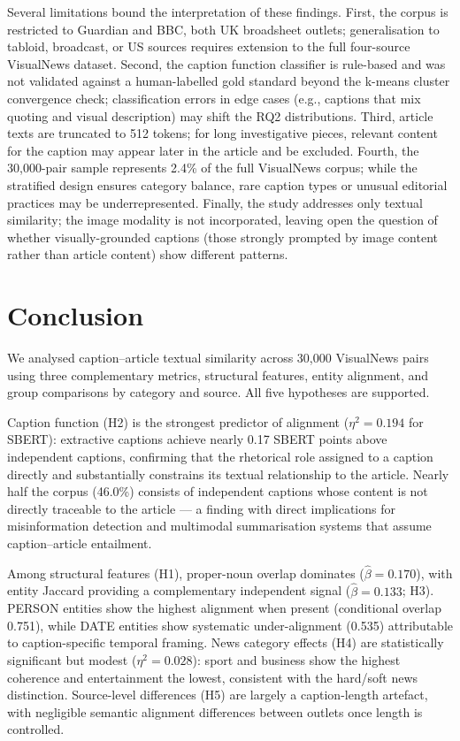 \documentclass[11pt,a4paper]{article}
\begin{document}
Several limitations bound the interpretation of these findings. First,
the corpus is restricted to Guardian and BBC, both UK broadsheet outlets;
generalisation to tabloid, broadcast, or US sources requires extension
to the full four-source VisualNews dataset. Second, the caption function
classifier is rule-based and was not validated against a human-labelled
gold standard beyond the k-means cluster convergence check; classification
errors in edge cases (e.g., captions that mix quoting and visual
description) may shift the RQ2 distributions. Third, article texts are
truncated to 512 tokens; for long investigative pieces, relevant content
for the caption may appear later in the article and be excluded.
Fourth, the 30,000-pair sample represents 2.4\% of the full VisualNews
corpus; while the stratified design ensures category balance, rare
caption types or unusual editorial practices may be underrepresented.
Finally, the study addresses only textual similarity; the image modality
is not incorporated, leaving open the question of whether
visually-grounded captions (those strongly prompted by image content
rather than article content) show different patterns.

\section{Conclusion}

We analysed caption--article textual similarity across 30,000 VisualNews
pairs using three complementary metrics, structural features, entity
alignment, and group comparisons by category and source. All five
hypotheses are supported.

Caption function (H2) is the strongest predictor of alignment
($\eta^2 = 0.194$ for SBERT): extractive captions achieve nearly 0.17
SBERT points above independent captions, confirming that the rhetorical
role assigned to a caption directly and substantially constrains its
textual relationship to the article. Nearly half the corpus (46.0\%)
consists of independent captions whose content is not directly traceable
to the article --- a finding with direct implications for misinformation
detection and multimodal summarisation systems that assume caption--article
entailment.

Among structural features (H1), proper-noun overlap dominates
($\hat{\beta} = 0.170$), with entity Jaccard providing a complementary
independent signal ($\hat{\beta} = 0.133$; H3). PERSON entities show
the highest alignment when present (conditional overlap 0.751), while
DATE entities show systematic under-alignment (0.535) attributable to
caption-specific temporal framing. News category effects (H4) are
statistically significant but modest ($\eta^2 = 0.028$): sport and
business show the highest coherence and entertainment the lowest,
consistent with the hard/soft news distinction. Source-level differences
(H5) are largely a caption-length artefact, with negligible semantic
alignment differences between outlets once length is controlled.
\end{document}
